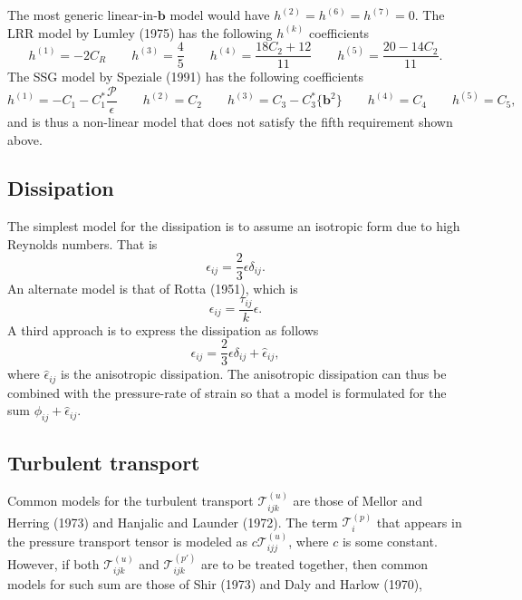 \documentclass[oneside,a4paper,11pt]{report}
\newcommand{\rs}{\tau}          %
\newcommand{\redi}{\phi}        %
\begin{document}
The most generic linear-in-$\mathbf{b}$ model would have $h^{(2)} = h^{(6)} = h^{(7)} = 0$. The LRR model by Lumley (1975) has the following $h^{(k)}$ coefficients
\begin{equation}
h^{(1)} = -2C_R \qquad h^{(3)} = \frac{4}{5} \qquad h^{(4)} = \frac{18 C_2 + 12}{11} \qquad h^{(5)} = \frac{20 - 14 C_2}{11}.
\end{equation}
The SSG model by Speziale (1991) has the following coefficients
\begin{equation}
h^{(1)} =  -C_1 - C_1^*\frac{\mathcal{P}}{\epsilon} \qquad h^{(2)} = C_2 \qquad h^{(3)} = C_3 - C_3^* \{\mathbf{b}^2 \} \qquad h^{(4)} = C_4 \qquad h^{(5)} = C_5,
\end{equation}
and is thus a non-linear model that does not satisfy the fifth requirement shown above.

\subsection{Dissipation}

The simplest model for the dissipation is to assume an isotropic form due to high Reynolds numbers. That is
\begin{equation}
\epsilon_{ij} = \frac{2}{3} \epsilon \delta_{ij}.
\end{equation}
An alternate model is that of Rotta (1951), which is 
\begin{equation}
\epsilon_{ij} = \frac{\rs_{ij}}{k} \epsilon.
\end{equation}
A third approach is to express the dissipation as follows
\begin{equation}
\epsilon_{ij} = \frac{2}{3} \epsilon \delta_{ij} + \hat{\epsilon}_{ij},
\end{equation}
where $\hat{\epsilon}_{ij}$ is the anisotropic dissipation. The anisotropic dissipation can thus be combined with the pressure-rate of strain so that a model is formulated for the sum $\redi_{ij} + \hat{\epsilon}_{ij}$.

\subsection{Turbulent transport}
Common models for the turbulent transport $\mathcal{T}^{(u)}_{ijk}$ are those of Mellor and Herring (1973) and Hanjalic and Launder (1972). The term $\mathcal{T}^{(p)}_i$ that appears in the pressure transport tensor is modeled as $c\mathcal{T}^{(u)}_{ijj}$, where $c$ is some constant. However, if both $\mathcal{T}^{(u)}_{ijk}$ and $\mathcal{T}^{(p')}_{ijk}$ are to be treated together, then common models for such sum are those of Shir (1973) and Daly and Harlow (1970),
\end{document}
